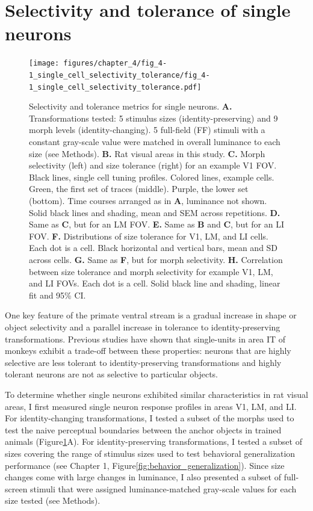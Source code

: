 \section{Selectivity and tolerance of single neurons}
\begin{figure}[hbt!]
    \texttt{[image: figures/chapter\_4/fig\_4-1\_single\_cell\_selectivity\_tolerance/fig\_4-1\_single\_cell\_selectivity\_tolerance.pdf]}
    \caption[Single neuron selectivity and tolerance]{Selectivity and tolerance metrics for single neurons. 
    \textbf{A.} Transformations tested: 5 stimulus sizes (identity-preserving) and 9 morph levels (identity-changing). 5 full-field (FF) stimuli with a constant gray-scale value were matched in overall luminance to each size (see Methods).
    \textbf{B.} Rat visual areas in this study. 
    \textbf{C.} Morph selectivity (left) and size tolerance (right) for an example V1 FOV. Black lines, single cell tuning profiles. Colored lines, example cells. Green, the first set of traces (middle). Purple, the lower set (bottom). Time courses arranged as in \textbf{A}, luminance not shown. Solid black lines and shading, mean and SEM across repetitions.
    \textbf{D.} Same as \textbf{C}, but for an LM FOV.
    \textbf{E.} Same as \textbf{B} and \textbf{C}, but for an LI FOV.
    \textbf{F.} Distributions of size tolerance for V1, LM, and LI cells. Each dot is a cell. Black horizontal and vertical bars, mean and SD across cells.
    \textbf{G.} Same as \textbf{F}, but for morph selectivity. 
    \textbf{H.} Correlation between size tolerance and morph selectivity for example V1, LM, and LI FOVs. Each dot is a cell. Solid black line and shading, linear fit and 95\% CI.
    \label{fig:selectivity_tolerance}}
\end{figure}

One key feature of the primate ventral stream is a gradual increase in shape or object selectivity and a parallel increase in tolerance to identity-preserving transformations. Previous studies have shown that single-units in area IT of monkeys exhibit a trade-off between these properties: neurons that are highly selective are less tolerant to identity-preserving transformations and highly tolerant neurons are not as selective to particular objects\cite{Zoccolan2007}.

To determine whether single neurons exhibited similar characteristics in rat visual areas, I first measured single neuron response profiles in areas V1, LM, and LI. For identity-changing transformations, I tested a subset of the morphs used to test the naive perceptual boundaries between the anchor objects in trained animals (Figure\ref{fig:selectivity_tolerance}A). For identity-preserving transformations, I tested a subset of sizes covering the range of stimulus sizes used to test behavioral generalization performance (see Chapter 1, Figure\ref{fig:behavior_generalization}). Since size changes come with large changes in luminance, I also presented a subset of full-screen stimuli that were assigned luminance-matched gray-scale values for each size tested (see Methods).

